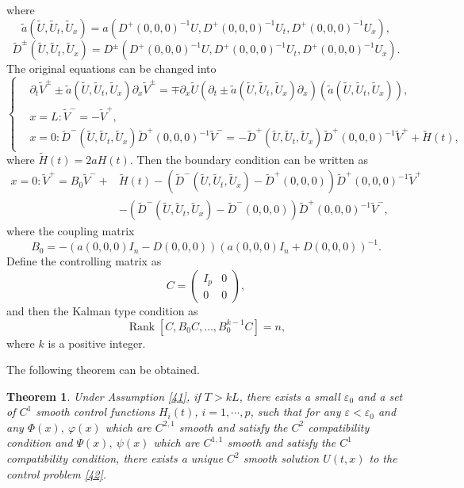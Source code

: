 \documentclass[a4paper,reqno,11pt]{amsart}
\numberwithin{equation}{section} %
\newtheorem{thm}{Theorem}
\begin{document}
where
$$
\tilde{a} \left(\tilde{U} , \tilde{U} _t, \tilde{U} _x\right)=a\left(D^{+}(0,0,0)^{-1} U, D^{+}(0,0,0)^{-1} U_t, D^{+}(0,0,0)^{-1} U_x\right) ,
$$
$$
\tilde{D} ^{\pm}\left(\tilde{U} , \tilde{U} _t, \tilde{U} _x\right)=D^{\pm}\left(D^{+}(0,0,0)^{-1} U, D^{+}(0,0,0)^{-1} U_t, D^{+}(0,0,0)^{-1} U_x\right) .
$$
The original equations can be changed into
\begin{equation}\label{hyperbolic equations}
    \begin{cases}
    & \partial_t \tilde{V} ^{ \pm} \pm \tilde{a} \left(\tilde{U} , \tilde{U} _t, \tilde{U} _x\right) \partial_x \tilde{V} ^{ \pm}=\mp \partial_x \tilde{U} \left(\partial_t \pm \tilde{a} \left(\tilde{U} , \tilde{U} _t, \tilde{U} _x\right) \partial_x\right)\left(\tilde{a} \left(\tilde{U} , \tilde{U} _t, \tilde{U} _x\right)\right) ,\\
    & x=L:\tilde{ V} ^{-}=-\tilde{V} ^{+} ,\\
    & x=0: \tilde{D} ^{-}\left(\tilde{U} , \tilde{U} _t, \tilde{U} _x\right) \tilde{D} ^{+}(0,0,0)^{-1} \tilde{V} ^{-}=-\tilde{D} ^{+}\left(\tilde{U} , \tilde{U} _t, \tilde{U} _x\right) \tilde{D} ^{+}(0,0,0)^{-1} \tilde{V} ^{+}+\tilde{H} (t),
\end{cases}
\end{equation}
where $\tilde{H} (t)=2aH(t)$. Then the boundary condition can be written as
$$
\begin{aligned}
x=0: \widetilde{V}^{+}=B_0 \widetilde{V}^{-}+ & \widetilde{H}(t)-\left(\widetilde{D}^{-}\left(\widetilde{U}, \widetilde{U}_t, \widetilde{U}_x\right)-\widetilde{D}^{+}(0,0,0)\right) \widetilde{D}^{+}(0,0,0)^{-1} \widetilde{V}^{+} \\
& -\left(\widetilde{D}^{-}\left(\widetilde{U}, \widetilde{U}_t, \widetilde{U}_x\right)-\widetilde{D}^{-}(0,0,0)\right) \widetilde{D}^{+}(0,0,0)^{-1} \widetilde{V}^{-},
\end{aligned}
$$
where the coupling matrix 
$$
B_0=-\left(a(0,0,0) I_n-D(0,0,0)\right)\left(a(0,0,0) I_n+D(0,0,0)\right)^{-1} .
$$
Define the controlling matrix as 
$$
C=\left(\begin{array}{cc}
I_p & 0 \\
0 & 0
\end{array}\right) ,
$$
and then the Kalman type condition as
\begin{equation}\label{41}
    \operatorname{Rank}\left[C, B_0 C, \ldots, B_0^{k-1} C\right]=n,
\end{equation}
where $k$ is a positive integer.

The following theorem can be obtained.
\begin{thm} \label{thm:main}
	Under Assumption \eqref{41}, if $T > kL$, there exists a small $\varepsilon _0$ and a set of $C^1$ smooth control functions $H_i(t)$, $i=1,\cdots ,p$, such that for any $\varepsilon < \varepsilon _0 $ and any $\varPhi (x),\ \varphi  (x)$ which are $C^{2,1}$ smooth and satisfy the $C^2$ compatibility condition and $\varPsi (x),\ \psi (x)$ which are $C^{1,1}$ smooth and satisfy the $C^1$ compatibility condition, there exists a unique $C^2$ smooth solution $U(t,x)$ to the control problem \eqref{42}.
\end{thm}
\end{document}
